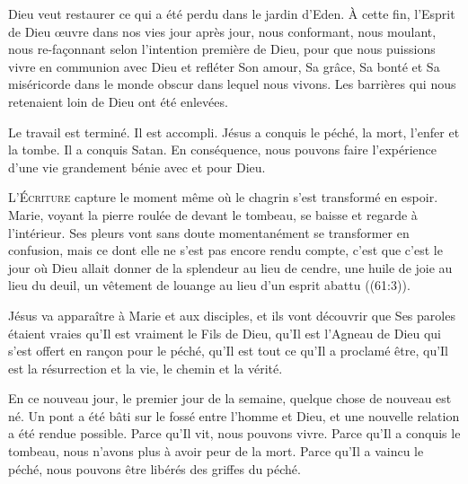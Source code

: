 Dieu veut restaurer ce qui a été perdu dans le jardin d'Eden.
 À cette fin, l'Esprit de Dieu œuvre dans nos vies jour après jour,
 nous conformant, nous moulant, nous re-façonnant selon l'intention
 première de Dieu, pour que nous puissions vivre en communion avec Dieu
 et refléter Son amour, Sa grâce, Sa bonté et Sa miséricorde
 dans le monde obscur dans lequel nous vivons.
 Les barrières qui nous retenaient loin de Dieu ont été enlevées.

Le travail est terminé. Il est accompli. Jésus a conquis le péché,
 la mort, l'enfer et la tombe. Il a conquis Satan. En conséquence,
 nous pouvons faire l'expérience d'une vie grandement bénie avec et pour Dieu.

\dvrule






\lettrine{L}{'Écriture} capture le moment même où le chagrin
 s'est transformé en espoir. Marie, voyant la pierre roulée
 de devant le tombeau, se baisse et regarde à l'intérieur.
 Ses pleurs vont sans doute momentanément se transformer en confusion,
 mais ce dont elle ne s'est pas encore rendu compte,
 c'est que c'est le jour où Dieu allait donner \og de la splendeur
 au lieu de cendre, une huile de joie au lieu du deuil,
 un vêtement de louange au lieu d'un esprit abattu \fg{}
 ((61:3)).


Jésus va apparaître à Marie et aux disciples, et ils vont découvrir
 que Ses paroles étaient vraies \ocadr qu'Il est vraiment le Fils de Dieu,
 qu'Il est l'Agneau de Dieu qui s'est offert en rançon pour le péché,
 qu'Il est tout ce qu'Il a proclamé être, qu'Il est la résurrection et la vie,
 le chemin et la vérité.

En ce nouveau jour, le premier jour de la semaine,
 quelque chose de nouveau est né. Un pont a été bâti sur le fossé
 entre l'homme et Dieu, et une nouvelle relation a été rendue possible.
 Parce qu'Il vit, nous pouvons vivre. Parce qu'Il a conquis le tombeau,
 nous n'avons plus à avoir peur de la mort. Parce qu'Il a vaincu le péché,
 nous pouvons être libérés des griffes du péché.

